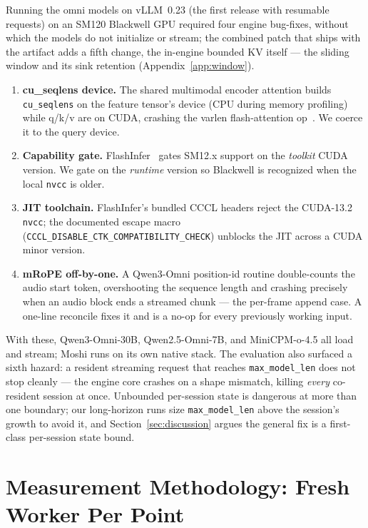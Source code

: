 Running the omni models on vLLM~0.23 (the first release with resumable requests) on an SM120 Blackwell
GPU required four engine bug-fixes, without which the models do not initialize or stream; the combined
patch that ships with the artifact adds a fifth change, the in-engine bounded KV itself --- the sliding
window and its sink retention (Appendix~\ref{app:window}).

\begin{enumerate}[leftmargin=1.4em,itemsep=2pt]
\item \textbf{cu\_seqlens device.} The shared multimodal encoder attention builds \texttt{cu\_seqlens} on
the feature tensor's device (CPU during memory profiling) while q/k/v are on CUDA, crashing the varlen
flash-attention op~\citep{flashattn}. We coerce it to the query device.
\item \textbf{Capability gate.} FlashInfer~\citep{flashinfer} gates SM12.x support on the \emph{toolkit}
CUDA version. We gate on the \emph{runtime} version so Blackwell is recognized when the local
\texttt{nvcc} is older.
\item \textbf{JIT toolchain.} FlashInfer's bundled CCCL headers reject the CUDA-13.2 \texttt{nvcc}; the
documented escape macro (\texttt{CCCL\_DISABLE\_CTK\_COMPATIBILITY\_CHECK}) unblocks the JIT across a
CUDA minor version.
\item \textbf{mRoPE off-by-one.} A Qwen3-Omni position-id routine double-counts the audio start token,
overshooting the sequence length and crashing precisely when an audio block ends a streamed chunk --- the
per-frame append case. A one-line reconcile fixes it and is a no-op for every previously working input.
\end{enumerate}

With these, Qwen3-Omni-30B, Qwen2.5-Omni-7B, and MiniCPM-o-4.5 all load and stream; Moshi runs on its own
native stack. The evaluation also surfaced a sixth hazard: a resident streaming request that reaches
\texttt{max\_model\_len} does not stop cleanly --- the engine core crashes on a shape mismatch, killing
\emph{every} co-resident session at once. Unbounded per-session state is dangerous at more than one
boundary; our long-horizon runs size \texttt{max\_model\_len} above the session's growth to avoid it, and
Section~\ref{sec:discussion} argues the general fix is a first-class per-session state bound.

\section{Measurement Methodology: Fresh Worker Per Point}
\label{app:method}

